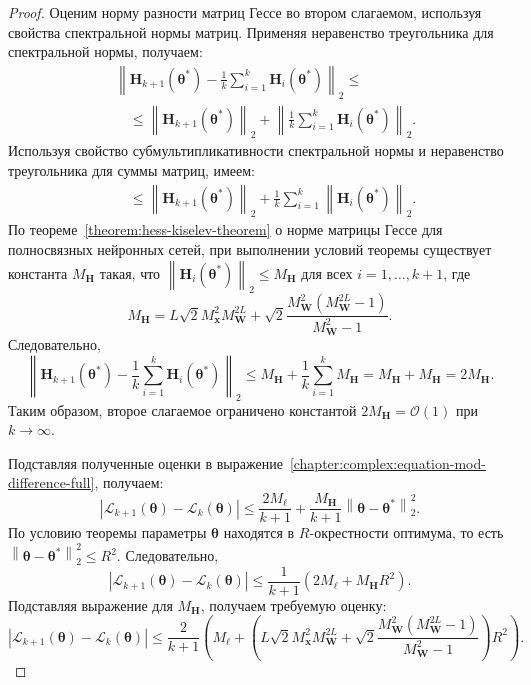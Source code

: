 \begin{proof}
    Оценим норму разности матриц Гессе во втором слагаемом, используя свойства спектральной нормы матриц. Применяя неравенство треугольника для спектральной нормы, получаем:
    \begin{align}
        & \left\| \mathbf{H}_{k+1}(\boldsymbol{\theta}^*) - \frac{1}{k} \sum\limits_{i=1}^{k} \mathbf{H}_{i}(\boldsymbol{\theta}^*) \right\|_2 \leqslant \\
        &\quad\leqslant \left\| \mathbf{H}_{k+1}(\boldsymbol{\theta}^*) \right\|_2 + \left\| \frac{1}{k} \sum\limits_{i=1}^{k} \mathbf{H}_{i}(\boldsymbol{\theta}^*) \right\|_2.
    \end{align}
    Используя свойство субмультипликативности спектральной нормы и неравенство треугольника для суммы матриц, имеем:
    \begin{align}
        &\quad\leqslant \left\| \mathbf{H}_{k+1}(\boldsymbol{\theta}^*) \right\|_2 + \frac{1}{k} \sum\limits_{i=1}^{k} \left\| \mathbf{H}_{i}(\boldsymbol{\theta}^*) \right\|_2.
    \end{align}
    По теореме~\ref{theorem:hess-kiselev-theorem} о норме матрицы Гессе для полносвязных нейронных сетей, при выполнении условий теоремы существует константа $M_{\mathbf{H}}$ такая, что $\left\| \mathbf{H}_{i}(\boldsymbol{\theta}^*) \right\|_2 \leqslant M_{\mathbf{H}}$ для всех $i = 1, \ldots, k+1$, где
    \[
        M_{\mathbf{H}} = L \sqrt{2} M_{\mathbf{x}}^2 M_{\mathbf{W}}^{2L} + \sqrt{2} \frac{M_{\mathbf{W}}^2 (M_{\mathbf{W}}^{2L} - 1)}{M_{\mathbf{W}}^2 - 1}.
    \]
    Следовательно,
    \[
        \left\| \mathbf{H}_{k+1}(\boldsymbol{\theta}^*) - \frac{1}{k} \sum\limits_{i=1}^{k} \mathbf{H}_{i}(\boldsymbol{\theta}^*) \right\|_2 \leqslant M_{\mathbf{H}} + \frac{1}{k} \sum\limits_{i=1}^{k} M_{\mathbf{H}} = M_{\mathbf{H}} + M_{\mathbf{H}} = 2M_{\mathbf{H}}.
    \]
    Таким образом, второе слагаемое ограничено константой $2M_{\mathbf{H}} = \mathcal{O}(1)$ при $k \to \infty$.

    Подставляя полученные оценки в выражение~\eqref{chapter:complex:equation-mod-difference-full}, получаем:
    \[
        \left| \mathcal{L}_{k+1}(\boldsymbol{\theta}) - \mathcal{L}_k(\boldsymbol{\theta}) \right| \leqslant \frac{2M_{\ell}}{k+1} + \frac{M_{\mathbf{H}}}{k+1} \left\|\boldsymbol{\theta} - \boldsymbol{\theta}^*\right\|_2^2.
    \]
    По условию теоремы параметры $\boldsymbol{\theta}$ находятся в $R$-окрестности оптимума, то есть $\left\|\boldsymbol{\theta} - \boldsymbol{\theta}^*\right\|_2^2 \leqslant R^2$. Следовательно,
    \[
        \left| \mathcal{L}_{k+1}(\boldsymbol{\theta}) - \mathcal{L}_k(\boldsymbol{\theta}) \right| \leqslant \frac{1}{k+1}\left( 2M_{\ell} + M_{\mathbf{H}}R^2 \right).
    \]
    Подставляя выражение для $M_{\mathbf{H}}$, получаем требуемую оценку:
    \[
        \left| \mathcal{L}_{k+1}(\boldsymbol{\theta}) - \mathcal{L}_k(\boldsymbol{\theta}) \right| \leqslant \frac{2}{k+1}\left( M_{\ell} + \left( L \sqrt{2} M_{\mathbf{x}}^2 M_{\mathbf{W}}^{2L} + \sqrt{2} \frac{M_{\mathbf{W}}^2 (M_{\mathbf{W}}^{2L} - 1)}{M_{\mathbf{W}}^2 - 1} \right) R^2 \right).
    \]


\end{proof}
